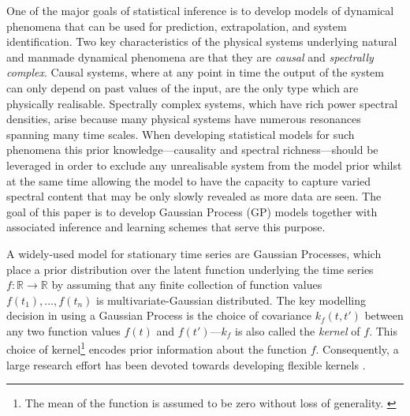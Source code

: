 \documentclass{article}
\newcommand{\R}{\mathbb{R}}   %
\begin{document}
One of the major goals of statistical inference is to develop models of dynamical phenomena that can be used for prediction, extrapolation, and system identification. Two key characteristics of the physical systems underlying natural and manmade dynamical phenomena are that they are \textit{causal} and \textit{spectrally complex}. Causal systems, where at any point in time the output of the system can only depend on past values of the input, are the only type which are physically realisable. Spectrally complex systems, which have rich power spectral densities, arise because many physical systems have numerous resonances spanning many time scales. When developing statistical models for such phenomena this prior knowledge---causality and spectral richness---should be leveraged in order to exclude any unrealisable system from the model prior whilst at the same time allowing the model to have the capacity to capture varied spectral content that may be only slowly revealed as more data are seen. The goal of this paper is to develop Gaussian Process (GP) models together with associated inference and learning schemes that serve this purpose.

A widely-used model for stationary time series are Gaussian Processes, which place a prior distribution over the latent function underlying the time series $f:\R \to \R$ by assuming that any finite collection of function values $f(t_1),\ldots,f(t_n)$ is multivariate-Gaussian distributed. The key modelling decision in using a Gaussian Process is the choice of covariance $k_f(t,t')$ between any two function values $f(t)$ and $f(t')$---$k_f$ is also called the \textit{kernel} of $f$. This choice of kernel\footnote{The mean of the function is assumed to be zero without loss of generality. \cite{Rasmussen:2006:Gaussian_Processes}} encodes prior information about the function $f$. Consequently, a large research effort has been devoted towards developing flexible kernels \cite{Duvenaud:2014:Automatic_Construction,Wilson:2013:Spectral_Mixture,Tobar:2015:Learning_Stationary,Tobar:2015:Inter-Domain_Inducing}.
\end{document}
